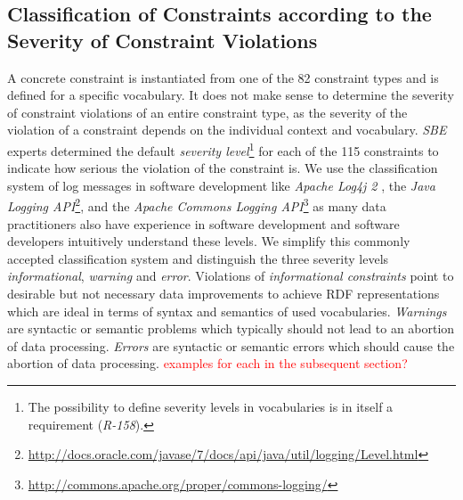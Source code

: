 \documentclass[conference]{IEEEtran}
\newcommand{\ke}[1]{\todo[size=\small, color=red!40]{\textbf{Kai:} #1}}
\begin{document}
\subsection{Classification of Constraints according to the Severity of Constraint Violations}

A concrete constraint is instantiated from one of the 82 constraint types and is defined for a specific vocabulary.
It does not make sense to determine the severity of constraint violations of an entire constraint type,
as the severity of the violation of a constraint depends on the individual context and vocabulary.
\emph{SBE} experts determined the default \emph{severity level}\footnote{The possibility to define severity levels in vocabularies is in itself a requirement (\emph{R-158}).} for each of the 115 constraints to indicate how serious the violation of the constraint is. We use the classification system of log messages in software development like \emph{Apache Log4j 2} \cite{Apache-2015}, the \emph{Java Logging API}\footnote{\url{http://docs.oracle.com/javase/7/docs/api/java/util/logging/Level.html}}, and the \emph{Apache Commons Logging API}\footnote{\url{http://commons.apache.org/proper/commons-logging/}} as many data practitioners also have experience in software development and software developers intuitively understand these levels. We simplify this commonly accepted classification system and distinguish the three severity levels \emph{informational}, \emph{warning} and \emph{error}.
Violations of \emph{informational constraints} point to desirable but not necessary data improvements to achieve RDF representations which are ideal in terms of syntax and semantics of used vocabularies. 
\emph{Warnings} are syntactic or semantic problems which typically should not lead to an abortion of data processing.
\emph{Errors} are syntactic or semantic errors which should cause the abortion of data processing. \textcolor{red}{examples for each in the subsequent section?}
\end{document}
